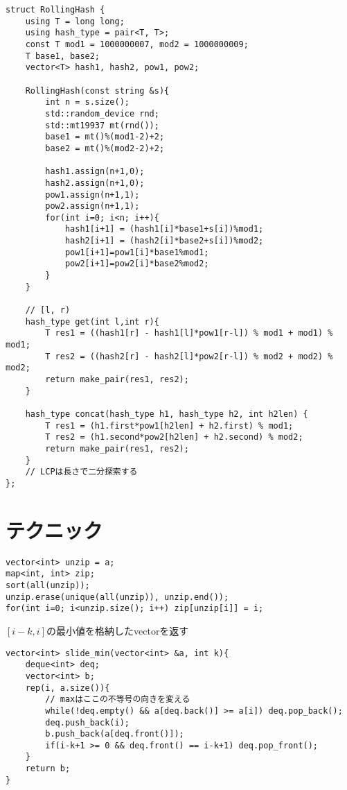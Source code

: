 \documentclass[11pt,a4paper]{jsarticle}
\newcommand{\minititle}[1]{\medskip{\large \sf #1}\medskip}
\begin{document}
\minititle{ローリングハッシュ}
\begin{lstlisting}
struct RollingHash {
    using T = long long;
    using hash_type = pair<T, T>;
    const T mod1 = 1000000007, mod2 = 1000000009;
    T base1, base2;
    vector<T> hash1, hash2, pow1, pow2;

    RollingHash(const string &s){
        int n = s.size();
        std::random_device rnd;
        std::mt19937 mt(rnd());
        base1 = mt()%(mod1-2)+2;
        base2 = mt()%(mod2-2)+2;

        hash1.assign(n+1,0);
        hash2.assign(n+1,0);
        pow1.assign(n+1,1);
        pow2.assign(n+1,1);
        for(int i=0; i<n; i++){
            hash1[i+1] = (hash1[i]*base1+s[i])%mod1;
            hash2[i+1] = (hash2[i]*base2+s[i])%mod2;
            pow1[i+1]=pow1[i]*base1%mod1;
            pow2[i+1]=pow2[i]*base2%mod2;
        }
    }

    // [l, r)
    hash_type get(int l,int r){
        T res1 = ((hash1[r] - hash1[l]*pow1[r-l]) % mod1 + mod1) % mod1;
        T res2 = ((hash2[r] - hash2[l]*pow2[r-l]) % mod2 + mod2) % mod2;
        return make_pair(res1, res2);
    }

    hash_type concat(hash_type h1, hash_type h2, int h2len) {
        T res1 = (h1.first*pow1[h2len] + h2.first) % mod1;
        T res2 = (h1.second*pow2[h2len] + h2.second) % mod2;
        return make_pair(res1, res2);
    }
    // LCPは長さで二分探索する
};
\end{lstlisting}


\section{テクニック}
\minititle{座標圧縮}
\begin{lstlisting}
vector<int> unzip = a;
map<int, int> zip;
sort(all(unzip));
unzip.erase(unique(all(unzip)), unzip.end());
for(int i=0; i<unzip.size(); i++) zip[unzip[i]] = i;
\end{lstlisting}

\newpage
\minititle{スライド最小値}

$[i-k, i]$の最小値を格納したvectorを返す
\begin{lstlisting}
vector<int> slide_min(vector<int> &a, int k){
    deque<int> deq;
    vector<int> b;
    rep(i, a.size()){
        // maxはここの不等号の向きを変える
        while(!deq.empty() && a[deq.back()] >= a[i]) deq.pop_back();
        deq.push_back(i);
        b.push_back(a[deq.front()]);
        if(i-k+1 >= 0 && deq.front() == i-k+1) deq.pop_front();
    }
    return b;
}
\end{lstlisting}
\end{document}
